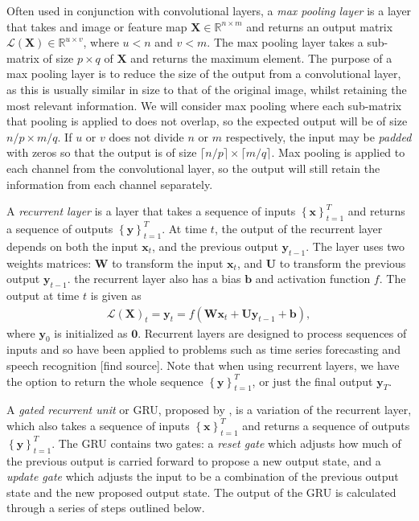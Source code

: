 \documentclass{somasmsc}
\begin{document}
Often used in conjunction with convolutional layers, a \textit{max pooling layer} is a layer that takes and image or feature map $\mathbf{X} \in \mathbb{R}^{n \times m}$ and returns an output matrix $\mathcal{L}\left(\mathbf{X}\right) \in \mathbb{R}^{u \times v}$, where $u < n$ and $v < m$. The max pooling layer takes a sub-matrix of size $p \times q$ of $\mathbf{X}$ and returns the maximum element. The purpose of a max pooling layer is to reduce the size of the output from a convolutional layer, as this is usually similar in size to that of the original image, whilst retaining the most relevant information. We will consider max pooling where each sub-matrix that pooling is applied to does not overlap, so the expected output will be of size $n/p \times m/q$. If $u$ or $v$ does not divide $n$ or $m$ respectively, the input may be \textit{padded} with zeros so that the output is of size $\lceil n/p \rceil \times \lceil m/q \rceil$. Max pooling is applied to each channel from the convolutional layer, so the output will still retain the information from each channel separately.


A \textit{recurrent layer} is a layer that takes a sequence of inputs $\left\{\pmb{x}\right\}_{t=1}^T$ and returns a sequence of outputs $\left\{\pmb{y}\right\}_{t=1}^T$. At time $t$, the output of the recurrent layer depends on both the input $\pmb{x}_t$, and the previous output $\pmb{y}_{t-1}$. The layer uses two weights matrices: $\mathbf{W}$ to transform the input $\pmb{x}_t$, and $\mathbf{U}$ to transform the previous output $\pmb{y}_{t-1}$. the recurrent layer also has a bias $\pmb{b}$ and activation function $f$. The output at time $t$ is given as
\begin{align*}
\mathcal{L}\left(\mathbf{X}\right)_t = \pmb{y}_t = f\left(\mathbf{W}\pmb{x}_t + \mathbf{U}\pmb{y}_{t-1} + \pmb{b}\right),
\end{align*}
where $\pmb{y}_0$ is initialized as $\mathbf{0}$. Recurrent layers are designed to process sequences of inputs and so have been applied to problems such as time series forecasting and speech recognition [find source]. Note that when using recurrent layers, we have the option to return the whole sequence $\left\{\pmb{y}\right\}_{t=1}^T$, or just the final output $\pmb{y}_T$.

A \textit{gated recurrent unit} or GRU, proposed by \citet{DBLP:journals/corr/ChoMGBSB14}, is a variation of the recurrent layer, which also takes a sequence of inputs $\left\{\pmb{x}\right\}_{t=1}^T$ and returns a sequence of outputs $\left\{\pmb{y}\right\}_{t=1}^T$. The GRU contains two gates: a \textit{reset gate} which adjusts how much of the previous output is carried forward to propose a new output state, and a \textit{update gate} which adjusts the input to be a combination of the previous output state and the new proposed output state. The output of the GRU is calculated through a series of steps outlined below.
\end{document}
